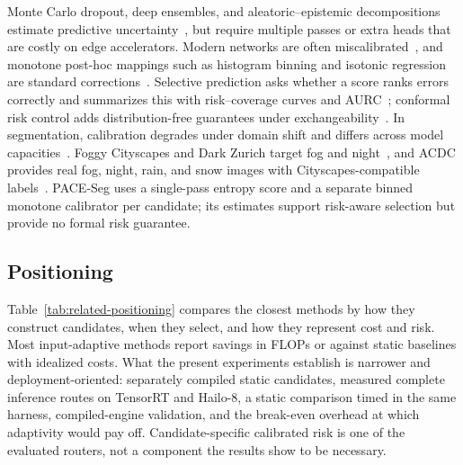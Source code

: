 \documentclass[a4paper,5p]{elsarticle}
\newcommand{\method}{PACE-Seg}
\begin{document}
Monte Carlo dropout, deep ensembles, and aleatoric--epistemic decompositions estimate predictive uncertainty~\cite{gal2016dropout,lakshminarayanan2017ensembles,kendall2017uncertainties}, but require multiple passes or extra heads that are costly on edge accelerators. Modern networks are often miscalibrated~\cite{guo2017calibration}, and monotone post-hoc mappings such as histogram binning and isotonic regression are standard corrections~\cite{zadrozny2002isotonic}. Selective prediction asks whether a score ranks errors correctly and summarizes this with risk--coverage curves and AURC~\cite{geifman2017selective}; conformal risk control adds distribution-free guarantees under exchangeability~\cite{angelopoulos2024crc}. In segmentation, calibration degrades under domain shift and differs across model capacities~\cite{wang2023calibrating,dejorge2023reliability}. Foggy Cityscapes and Dark Zurich target fog and night~\cite{sakaridis2018foggy,sakaridis2019darkzurich}, and ACDC provides real fog, night, rain, and snow images with Cityscapes-compatible labels~\cite{sakaridis2021acdc}. \method{} uses a single-pass entropy score and a separate binned monotone calibrator per candidate; its estimates support risk-aware selection but provide no formal risk guarantee.

\subsection{Positioning}

Table~\ref{tab:related-positioning} compares the closest methods by how they construct candidates, when they select, and how they represent cost and risk. Most input-adaptive methods report savings in FLOPs or against static baselines with idealized costs. What the present experiments establish is narrower and deployment-oriented: separately compiled static candidates, measured complete inference routes on TensorRT and Hailo-8, a static comparison timed in the same harness, compiled-engine validation, and the break-even overhead at which adaptivity would pay off. Candidate-specific calibrated risk is one of the evaluated routers, not a component the results show to be necessary.
\end{document}
